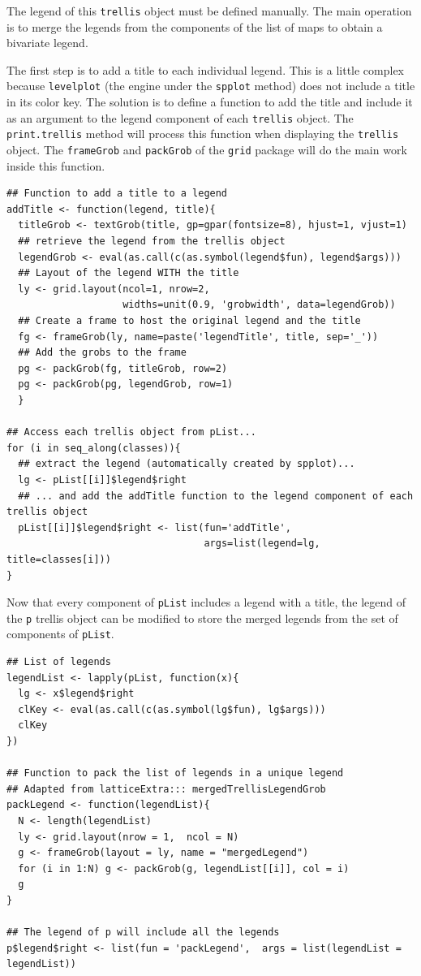 \documentclass[smallroyalvopaper]{memoir}
\begin{document}
The legend of this \texttt{trellis} object must be defined
manually. The main operation is to merge the legends from the
components of the list of maps to obtain a bivariate
legend. 

The first step is to add a title to each individual legend.  This is a
little complex because \texttt{levelplot} (the engine under the \texttt{spplot}
method) does not include a title in its color key. The solution is to
define a function to add the title and include it as an argument to
the legend component of each \texttt{trellis} object. The \texttt{print.trellis}
method will process this function when displaying the \texttt{trellis}
object. The \texttt{frameGrob} and \texttt{packGrob} of the \texttt{grid} package will do
the main work inside this function.

\lstset{language=R,numbers=none}
\begin{lstlisting}
## Function to add a title to a legend
addTitle <- function(legend, title){
  titleGrob <- textGrob(title, gp=gpar(fontsize=8), hjust=1, vjust=1)
  ## retrieve the legend from the trellis object
  legendGrob <- eval(as.call(c(as.symbol(legend$fun), legend$args)))
  ## Layout of the legend WITH the title
  ly <- grid.layout(ncol=1, nrow=2,
                    widths=unit(0.9, 'grobwidth', data=legendGrob))
  ## Create a frame to host the original legend and the title
  fg <- frameGrob(ly, name=paste('legendTitle', title, sep='_'))
  ## Add the grobs to the frame
  pg <- packGrob(fg, titleGrob, row=2)
  pg <- packGrob(pg, legendGrob, row=1)
  }

## Access each trellis object from pList...
for (i in seq_along(classes)){
  ## extract the legend (automatically created by spplot)...
  lg <- pList[[i]]$legend$right
  ## ... and add the addTitle function to the legend component of each trellis object
  pList[[i]]$legend$right <- list(fun='addTitle',
                                  args=list(legend=lg, title=classes[i]))
}
\end{lstlisting}

Now that every component of \texttt{pList} includes a legend with a title,
the legend of the \texttt{p} trellis object can be modified to store the
merged legends from the set of components of \texttt{pList}.

\lstset{language=R,numbers=none}
\begin{lstlisting}
## List of legends
legendList <- lapply(pList, function(x){
  lg <- x$legend$right
  clKey <- eval(as.call(c(as.symbol(lg$fun), lg$args)))
  clKey
})

## Function to pack the list of legends in a unique legend
## Adapted from latticeExtra::: mergedTrellisLegendGrob
packLegend <- function(legendList){
  N <- length(legendList)
  ly <- grid.layout(nrow = 1,  ncol = N)
  g <- frameGrob(layout = ly, name = "mergedLegend")
  for (i in 1:N) g <- packGrob(g, legendList[[i]], col = i)
  g
}

## The legend of p will include all the legends
p$legend$right <- list(fun = 'packLegend',  args = list(legendList = legendList))
\end{lstlisting}
\end{document}
